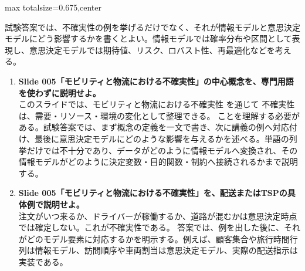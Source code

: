 \begin{adjustbox}{max totalsize={\textwidth}{0.675\textheight},center}
\begin{minipage}{\textwidth}
\begin{minipage}[t]{0.485\textwidth}
試験答案では、不確実性の例を挙げるだけでなく、それが情報モデルと意思決定モデルにどう影響するかを書くとよい。情報モデルでは確率分布や区間として表現し、意思決定モデルでは期待値、リスク、ロバスト性、再最適化などを考える。\par
{}
\begin{enumerate}
\item \textbf{Slide 005「モビリティと物流における不確実性」の中心概念を、専門用語を使わずに説明せよ。}\\このスライドでは、モビリティと物流における不確実性 を通じて 不確実性は、需要・リソース・環境の変化として整理できる。 ことを理解する必要がある。試験答案では、まず概念の定義を一文で書き、次に講義の例へ対応付け、最後に意思決定モデルにどのような影響を与えるかを述べる。単語の列挙だけでは不十分であり、データがどのように情報モデルへ変換され、その情報モデルがどのように決定変数・目的関数・制約へ接続されるかまで説明する。
\item \textbf{Slide 005「モビリティと物流における不確実性」を、配送またはTSPの具体例で説明せよ。}\\注文がいつ来るか、ドライバーが稼働するか、道路が混むかは意思決定時点では確定しない。これが不確実性である。 答案では、例を出した後に、それがどのモデル要素に対応するかを明示する。例えば、顧客集合や旅行時間行列は情報モデル、訪問順序や車両割当は意思決定モデル、実際の配送指示は実装である。
\end{enumerate}
\end{minipage}
\end{minipage}
\end{adjustbox}

